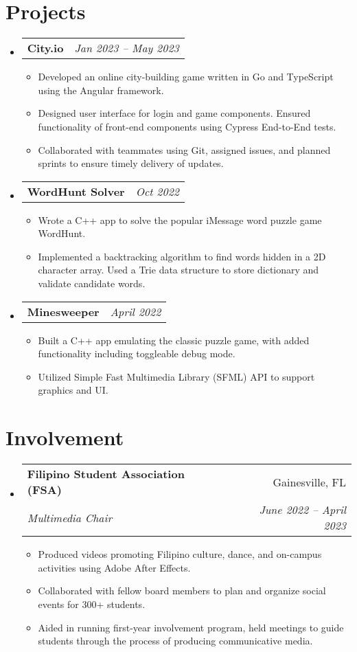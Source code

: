 \documentclass[letterpaper,11pt]{article}
\makeatletter
\newcommand{\resumeItemExperience}[1]{
  \item\small{
    {#1 \vspace{-2pt}}
  }
}
\newcommand{\resumeSubheading}[4]{
  \vspace{-1pt}\item
    \begin{tabular*}{0.97\textwidth}{l@{\extracolsep{\fill}}r}
      \textbf{#1} & #2 \\
      \textit{\small#3} & \textit{\small #4} \\
    \end{tabular*}\vspace{-6pt}
}
\newcommand{\resumeSubheadingProject}[2]{
  \vspace{-1pt}\item
    \begin{tabular*}{0.97\textwidth}{l@{\extracolsep{\fill}}r}
      \textbf{#1} & \textit{\small #2} \\
    \end{tabular*}\vspace{-5pt}
}
\newcommand{\resumeSubHeadingListStart}{\begin{itemize}[leftmargin=*, label={}]}
\newcommand{\resumeSubHeadingListEnd}{\end{itemize}}
\newcommand{\resumeItemListStart}{\begin{itemize}}
\newcommand{\resumeItemListEnd}{\end{itemize}\vspace{-5pt}}
\makeatother
\begin{document}
\section{Projects}
  \resumeSubHeadingListStart
        \resumeSubheadingProject
          {City.io}{Jan 2023 -- May 2023}
          \resumeItemListStart
            \resumeItemExperience
              {Developed an online city-building game written in Go and TypeScript using the Angular framework.}
            \resumeItemExperience
              {Designed user interface for login and game components. Ensured functionality of front-end components using Cypress End-to-End tests.}
            \resumeItemExperience
              {Collaborated with teammates using Git, assigned issues, and planned sprints to ensure timely delivery of updates.}
          \resumeItemListEnd
        \resumeSubheadingProject
          {WordHunt Solver}{Oct 2022}
          \resumeItemListStart
            \resumeItemExperience
              {Wrote a C++ app to solve the popular iMessage word puzzle game WordHunt.}
            \resumeItemExperience
              {Implemented a backtracking algorithm to find words hidden in a 2D character array. Used a Trie data structure to store dictionary and validate candidate words.}
          \resumeItemListEnd
        \resumeSubheadingProject
          {Minesweeper}{April 2022}
          \resumeItemListStart
            \resumeItemExperience
              {Built a C++ app emulating the classic puzzle game, with added functionality including toggleable debug mode.}
            \resumeItemExperience
              {Utilized Simple Fast Multimedia Library (SFML) API to support graphics and UI.}
          \resumeItemListEnd
    \resumeSubHeadingListEnd
    
\section{Involvement}
    \resumeSubHeadingListStart
      \resumeSubheading
        {Filipino Student Association (FSA)}{Gainesville, FL}
        {Multimedia Chair}{June 2022 -- April 2023}
        \resumeItemListStart
          \resumeItemExperience
            {Produced videos promoting Filipino culture, dance, and on-campus activities using Adobe After Effects.}
          \resumeItemExperience
            {Collaborated with fellow board members to plan and organize social events for 300+ students.}
          \resumeItemExperience
            {Aided in running first-year involvement program, held meetings to guide students through the process of producing communicative media.}
        \resumeItemListEnd
    \resumeSubHeadingListEnd
          
\end{document}
